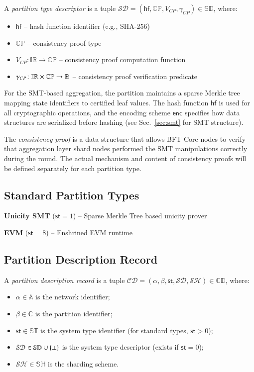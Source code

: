 A \emph{partition type descriptor} is a tuple $\mathcal{SD} = (\mathsf{hf}, \mathbb{CP}, V_{CP}, \gamma_{CP}) \in \mathbb{SD}$, where:
\begin{itemize}
\item $\mathsf{hf}$ -- hash function identifier (e.g., SHA-256)  %
\item $\mathbb{CP}$ -- consistency proof type
\item $V_{CP} \colon \mathbb{IR} \to \mathbb{CP}$ -- consistency proof computation function
\item $\gamma_{CP} \colon \mathbb{IR} \times \mathbb{CP} \to \mathbb{B}$ -- consistency proof verification predicate
\end{itemize}

For the SMT-based aggregation, the partition maintains a sparse Merkle tree mapping state identifiers to certified leaf values. The hash function $\mathsf{hf}$ is used for all cryptographic operations, and the encoding scheme $\mathsf{enc}$ specifies how data structures are serialized before hashing (see Sec.~\ref{sec:smt} for SMT structure).

The \emph{consistency proof} is a data structure that allows BFT Core nodes to verify that aggregation layer shard nodes performed the SMT manipulations correctly during the round. The actual mechanism and content of consistency proofs will be defined separately for each partition type.

\subsection{Standard Partition Types}

\textbf{Unicity SMT} ($\mathsf{st} = 1$) -- Sparse Merkle Tree based unicity prover

\textbf{EVM} ($\mathsf{st} = 8$) -- Enshrined EVM runtime

\subsection{Partition Description Record}

A \emph{partition description record} is a tuple $\mathcal{CD} = (\alpha, \beta, \mathsf{st}, \mathcal{SD}, \mathcal{SH}) \in \mathbb{CD}$, where:
\begin{itemize}
\item $\alpha \in \mathbb{A}$ is the network identifier;
\item $\beta \in \mathbb{C}$ is the partition identifier;
\item $\mathsf{st} \in \mathbb{ST}$ is the system type identifier (for standard types, $\mathsf{st} > 0$);
\item $\mathcal{SD} \in \mathbb{SD}\cup\{\bot\}$ is the system type descriptor (exists if $\mathsf{st} = 0$);
\item $\mathcal{SH} \in \mathbb{SH}$ is the sharding scheme.
\end{itemize}

